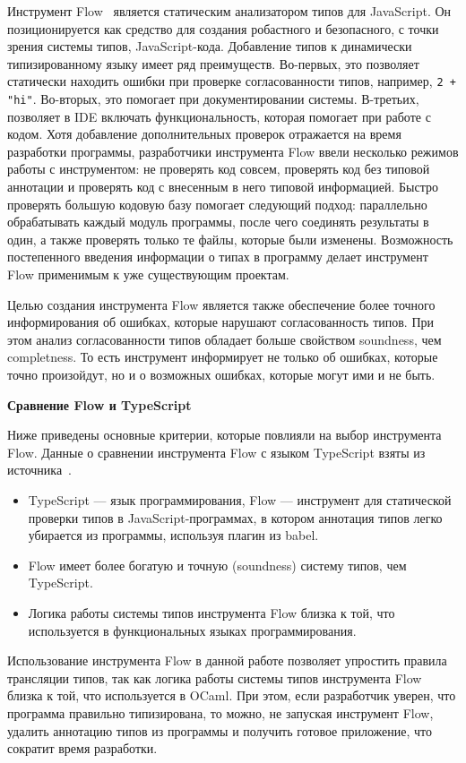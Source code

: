 Инструмент Flow~\cite{flow} является статическим анализатором типов для JavaScript. Он позиционируется как средство для создания робастного и безопасного, с точки зрения системы типов, JavaScript-кода. Добавление типов к динамически типизированному языку имеет ряд преимуществ. Во-первых, это позволяет статически находить ошибки при проверке согласованности типов, например, \verb|2 + "hi"|. Во-вторых, это помогает при документировании системы. В-третьих, позволяет в IDE включать функциональность, которая помогает при работе с кодом. Хотя добавление дополнительных проверок отражается на время разработки программы, разработчики инструмента Flow ввели несколько режимов работы с инструментом: не проверять код совсем, проверять код без типовой аннотации и проверять код с внесенным в него типовой информацией. Быстро проверять большую кодовую базу помогает следующий подход: параллельно обрабатывать каждый модуль программы, после чего соединять результаты в один, а также проверять только те файлы, которые были изменены. Возможность постепенного введения информации о типах в программу делает инструмент Flow применимым к уже существующим проектам.

Целью создания инструмента Flow является также обеспечение более точного информирования об ошибках, которые нарушают согласованность типов. При этом анализ согласованности типов обладает больше свойством soundness, чем completness. То есть инструмент информирует не только об ошибках, которые точно произойдут, но и о возможных ошибках, которые могут ими и не быть. 

\textbf{Сравнение Flow и TypeScript}

Ниже приведены основные критерии, которые повлияли на выбор инструмента Flow. Данные о сравнении инструмента Flow с языком TypeScript взяты из источника~\cite{flowts}.

\begin{itemize}
    \item TypeScript --- язык программирования, Flow --- инструмент для статической проверки типов в JavaScript-программах, в котором аннотация типов легко убирается из программы, используя плагин из babel.
    \item Flow имеет более богатую и точную (soundness) систему типов, чем TypeScript.
    \item Логика работы системы типов инструмента Flow близка к той, что используется в функциональных языках программирования.
\end{itemize}

Использование инструмента Flow в данной работе позволяет упростить правила трансляции типов, так как логика работы системы типов инструмента Flow близка к той, что используется в OCaml. При этом, если разработчик уверен, что программа правильно типизирована, то можно, не запуская инструмент Flow, удалить аннотацию типов из программы и получить готовое приложение, что сократит время разработки.

